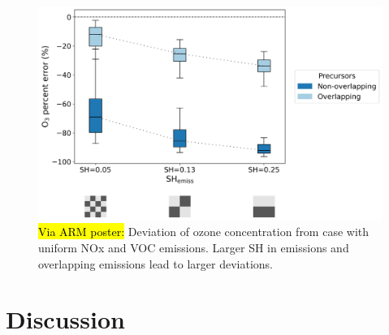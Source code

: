 \begin{figure}[h]
    \centering
    \includegraphics[width=\textwidth]{figures/O3-percent-err-vs-emiss-SH.png}
    \caption{\hl{Via ARM poster:} Deviation of ozone concentration from case with uniform NOx and VOC emissions. Larger SH in emissions and overlapping emissions lead to larger deviations.}
  \end{figure}
  
\section{Discussion}

